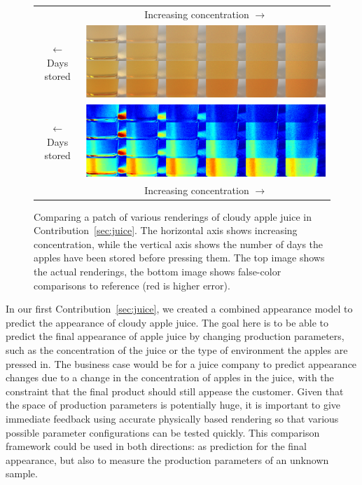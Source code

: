 \begin{figure}[t]
\centering
\begin{tabular}{@{}c@{}c@{}}
	 & Increasing concentration $\longrightarrow$ \\
	\begin{sideways}\hspace{1em}$\longleftarrow$ Days stored \end{sideways} \hspace{0.5mm} &\includegraphics[width=0.9\columnwidth]{figures/comparison_renderings.png} \\
	 \begin{sideways}\hspace{1em}$\longleftarrow$ Days stored \end{sideways} \hspace{0.5mm} &\includegraphics[width=0.9\columnwidth]{figures/comparison_diff.png}  \\
	 & Increasing concentration $\longrightarrow$

\end{tabular}
\caption{Comparing a patch of various renderings of cloudy apple juice in Contribution~\ref{sec:juice}. The horizontal axis shows increasing concentration, while the vertical axis shows the number of days the apples have been stored before pressing them. The top image shows the actual renderings, the bottom image shows false-color comparisons to reference (red is higher error).}
\label{fig:juicecomparisondetail}
\end{figure}

In our first Contribution~\ref{sec:juice}, we created a combined appearance model to predict the appearance of cloudy apple juice. The goal here is to be able to predict the final appearance of apple juice by changing production parameters, such as the concentration of the juice or the type of environment the apples are pressed in. The business case would be for a juice company to predict appearance changes due to a change in the concentration of apples in the juice, with the constraint that the final product should still appease  the customer. Given that the space of production parameters is potentially huge, it is important to give immediate feedback using accurate physically based rendering so that various possible parameter configurations can be tested quickly. This comparison framework could be used in both directions: as prediction for the final appearance, but also to measure the production parameters of an unknown sample. 

